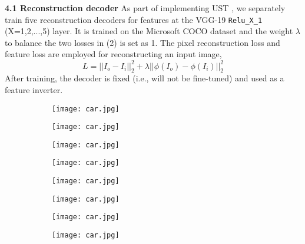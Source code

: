 \textbf{4.1 Reconstruction decoder}\newline
As part of implementing UST \cite{bib11}, we separately train five reconstruction decoders for features
at the VGG-19 \verb|Relu_X_1| (X=1,2,...,5) layer. It is trained on the Microsoft COCO dataset \cite{bib10} and
the weight $\lambda$ to balance the two losses in (2) is set as 1.
The pixel reconstruction loss \cite{bib22} and feature loss \cite{bib22, bib17} are employed for reconstructing an input image,
\begin{equation}
L= ||I_o-I_i||_2^2 +\lambda||\phi(I_o)-\phi(I_i)||_2^2
\end{equation}
After training, the decoder is fixed (i.e., will not be fine-tuned) and used as a feature inverter.
\begin{figure}[h!]
	\centering
	\begin{subfigure}[b]{0.3\linewidth}
		\texttt{[image: car.jpg]} %
	\end{subfigure}
	\begin{subfigure}[b]{0.3\linewidth}
		\texttt{[image: car.jpg]} %
	\end{subfigure}
	\begin{subfigure}[b]{0.3\linewidth}
		\texttt{[image: car.jpg]} %
	\end{subfigure}
		\centering
	\begin{subfigure}[b]{0.3\linewidth}
		\texttt{[image: car.jpg]} %
	\end{subfigure}
	\begin{subfigure}[b]{0.3\linewidth}
		\texttt{[image: car.jpg]} %
	\end{subfigure}
	\begin{subfigure}[b]{0.3\linewidth}
		\texttt{[image: car.jpg]} %
	\end{subfigure}
		\centering
	\begin{subfigure}[b]{0.3\linewidth}
		\texttt{[image: car.jpg]} %
	\end{subfigure}
	\begin{subfigure}[b]{0.3\linewidth}
		\texttt{[image: car.jpg]} %
	\end{subfigure}
	\begin{subfigure}[b]{0.3\linewidth}

\end{subfigure}
\end{figure}
